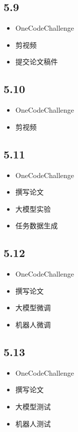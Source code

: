 \documentclass[UTF8]{ctexart}
\begin{document}
\subsection*{5.9}
\begin{itemize}
    \item OneCodeChallenge
    \item 剪视频
    \item 提交论文稿件
\end{itemize}

\subsection*{5.10}
\begin{itemize}
    \item OneCodeChallenge
    \item 剪视频
\end{itemize}

\subsection*{5.11}
\begin{itemize}
    \item OneCodeChallenge
    \item 撰写论文
    \item 大模型实验
    \item 任务数据生成
\end{itemize}

\subsection*{5.12}
\begin{itemize}
    \item OneCodeChallenge
    \item 撰写论文
    \item 大模型微调
    \item 机器人微调
\end{itemize}

\subsection*{5.13}
\begin{itemize}
    \item OneCodeChallenge
    \item 撰写论文
    \item 大模型测试
    \item 机器人测试
\end{itemize}
\end{document}

